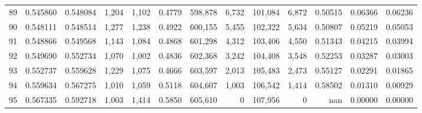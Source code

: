 \begin{tabular}{rrrrrrrrrrrrr}
89 &  0.545860 &  0.548084 &   1,204 &  1,102 &                                     0.4779 &  598,878 &    6,732 &  101,084 &    6,872 &  0.50515 &  0.06366 &  0.06236 \\
90 &  0.548111 &  0.548514 &   1,277 &  1,238 &                                     0.4922 &  600,155 &    5,455 &  102,322 &    5,634 &  0.50807 &  0.05219 &  0.05053 \\
91 &  0.548866 &  0.549568 &   1,143 &  1,084 &                                     0.4868 &  601,298 &    4,312 &  103,406 &    4,550 &  0.51343 &  0.04215 &  0.03994 \\
92 &  0.549690 &  0.552734 &   1,070 &  1,002 &                                     0.4836 &  602,368 &    3,242 &  104,408 &    3,548 &  0.52253 &  0.03287 &  0.03003 \\
93 &  0.552737 &  0.559628 &   1,229 &  1,075 &                                     0.4666 &  603,597 &    2,013 &  105,483 &    2,473 &  0.55127 &  0.02291 &  0.01865 \\
94 &  0.559634 &  0.567275 &   1,010 &  1,059 &                                     0.5118 &  604,607 &    1,003 &  106,542 &    1,414 &  0.58502 &  0.01310 &  0.00929 \\
95 &  0.567335 &  0.592718 &   1,003 &  1,414 &                                     0.5850 &  605,610 &        0 &  107,956 &        0 &      nan &  0.00000 &  0.00000 \\
\bottomrule
\end{tabular}
